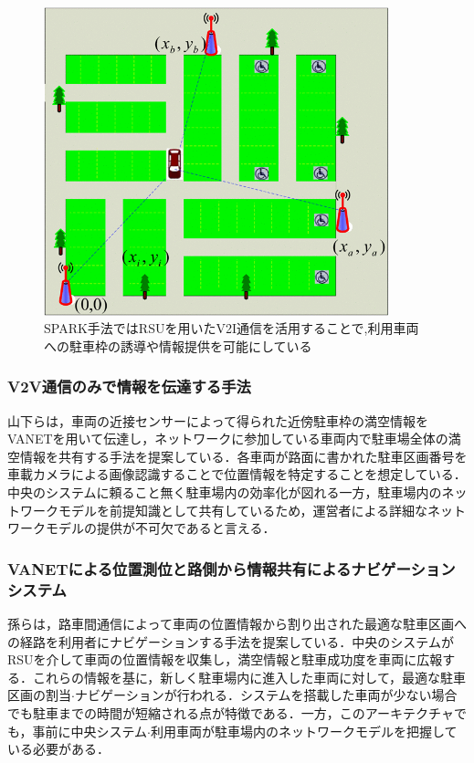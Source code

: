 \begin{figure}
	\centering
	\includegraphics[width=10cm]{fig/spark-1.png}
	\caption[R．Luらにより提案されたSPARK手法の概念図]{SPARK手法ではRSUを用いたV2I通信を活用することで,利用車両への駐車枠の誘導や情報提供を可能にしている \protect \footnotemark}
	\label{spark}
\end{figure}


\subsubsection{V2V通信のみで情報を伝達する手法}

山下らは，車両の近接センサーによって得られた近傍駐車枠の満空情報をVANETを用いて伝達し，ネットワークに参加している車両内で駐車場全体の満空情報を共有する手法を提案している\cite{Yamashita}．各車両が路面に書かれた駐車区画番号を車載カメラによる画像認識することで位置情報を特定することを想定している．中央のシステムに頼ること無く駐車場内の効率化が図れる一方，駐車場内のネットワークモデルを前提知識として共有しているため，運営者による詳細なネットワークモデルの提供が不可欠であると言える．

\subsubsection{VANETによる位置測位と路側から情報共有によるナビゲーションシステム}

孫らは，路車間通信によって車両の位置情報から割り出された最適な駐車区画への経路を利用者にナビゲーションする手法を提案している\cite{Sun-Kenmochi}．中央のシステムがRSUを介して車両の位置情報を収集し，満空情報と駐車成功度を車両に広報する．これらの情報を基に，新しく駐車場内に進入した車両に対して，最適な駐車区画の割当$\cdot$ナビゲーションが行われる．システムを搭載した車両が少ない場合でも駐車までの時間が短縮される点が特徴である．一方，このアーキテクチャでも，事前に中央システム$\cdot$利用車両が駐車場内のネットワークモデルを把握している必要がある．



